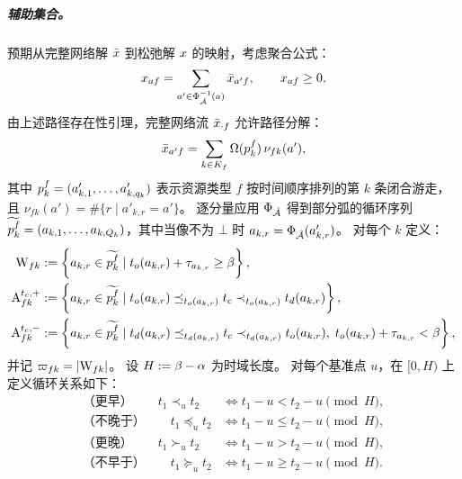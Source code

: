 \subparagraph*{辅助集合。}
预期从完整网络解 $\bar{\fleetAssignVar}$ 到松弛解 $\fleetAssignVar$ 的映射，考虑聚合公式：
\[
    \fleetAssignVar_{af}
        = \sum_{a'\in\Phi_{\arcSet}^{-1}(a)}\bar{\fleetAssignVar}_{a'f},
    \qquad
    x_{af}\ge0,
    \label{eq:fleet_avail.aggregate}
\]
由上述路径存在性引理，完整网络流 $\bar{\fleetAssignVar}_{\cdot f}$ 允许路径分解：
\[
    \bar{\fleetAssignVar}_{a'f}
        = \sum_{k\in K_f}
          \routeAmount{\pathInRoute{f}{k}}\,
          \nu_{fk}(a'),
    \label{eq:fleet_avail.route_decomp}
\]
其中 $\pathInRoute{f}{k}=(a'_{k,1},\ldots,a'_{k,q_k})$ 表示资源类型 $f$ 按时间顺序排列的第 $k$ 条闭合游走，且 $\nu_{fk}(a')=\#\{r\mid a'_{k,r}=a'\}$。
逐分量应用 $\Phi_{\arcSet}$ 得到部分弧的循环序列 $\widetilde{\pathInRoute{f}{k}}=(a_{k,1},\ldots,a_{k,Q_k})$，其中当像不为 $\bot$ 时 $a_{k,r}=\Phi_{\arcSet}(a'_{k,r})$。
对每个 $k$ 定义：
\begin{equation}
\label{eq:aux_sets_def}
\begin{aligned}
    \wrapSet_{fk}
        &:= \left\{a_{k,r}\in\widetilde{\pathInRoute{f}{k}}
            \mid t_o(a_{k,r})+\travelTime_{a_{k,r}}\ge \planningEnd\right\},\\
    \arcPosi
        &:= \left\{a_{k,r}\in\widetilde{\pathInRoute{f}{k}}
            \mid t_o(a_{k,r})\preceq_{t_o(a_{k,r})} \checkTime
                 \prec_{t_o(a_{k,r})} t_d(a_{k,r})\right\},\\
    \arcNega
        &:= \left\{a_{k,r}\in\widetilde{\pathInRoute{f}{k}}
            \mid t_d(a_{k,r})\preceq_{t_d(a_{k,r})} \checkTime
                 \prec_{t_d(a_{k,r})} t_o(a_{k,r}),\;
                 t_o(a_{k,r})+\travelTime_{a_{k,r}} < \planningEnd\right\},
\end{aligned}
\end{equation}
并记 $\wrapnum_{fk}=|\wrapSet_{fk}|$。
设 $H:=\planningEnd-\planningStart$ 为时域长度。
对每个基准点 $u$，在 $[0,H)$ 上定义循环关系如下：
\begin{equation*}
\begin{aligned}
    \text{（更早）}\qquad t_1\prec_u t_2 &\iff t_1-u < t_2-u \pmod{H},\\
    \text{（不晚于）}\qquad t_1\preceq_u t_2 &\iff t_1-u \le t_2-u \pmod{H},\\
    \text{（更晚）}\qquad t_1\succ_u t_2 &\iff t_1-u > t_2-u \pmod{H},\\
    \text{（不早于）}\qquad t_1\succeq_u t_2 &\iff t_1-u \ge t_2-u \pmod{H}.
\end{aligned}
\end{equation*}


